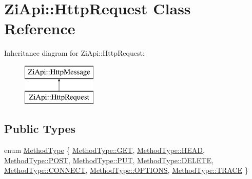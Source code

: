 \hypertarget{classZiApi_1_1HttpRequest}{}\section{Zi\+Api\+::Http\+Request Class Reference}
\label{classZiApi_1_1HttpRequest}
Inheritance diagram for Zi\+Api\+::Http\+Request\+:\begin{figure}[H]
\begin{center}
\leavevmode
\includegraphics[height=2.000000cm]{classZiApi_1_1HttpRequest}
\end{center}
\end{figure}
\subsection*{Public Types}
\begin{DoxyCompactItemize}
\item 
enum \mbox{\hyperlink{classZiApi_1_1HttpRequest_a8592cff867cbbc5cc43bd3a4d6053a1b}{Method\+Type}} \{ \newline
\mbox{\hyperlink{classZiApi_1_1HttpRequest_a8592cff867cbbc5cc43bd3a4d6053a1ba7528035a93ee69cedb1dbddb2f0bfcc8}{Method\+Type\+::\+G\+ET}}, 
\mbox{\hyperlink{classZiApi_1_1HttpRequest_a8592cff867cbbc5cc43bd3a4d6053a1bae15e216fc1c639f787b1231ecdfa1bf8}{Method\+Type\+::\+H\+E\+AD}}, 
\mbox{\hyperlink{classZiApi_1_1HttpRequest_a8592cff867cbbc5cc43bd3a4d6053a1baa02439ec229d8be0e74b0c1602392310}{Method\+Type\+::\+P\+O\+ST}}, 
\mbox{\hyperlink{classZiApi_1_1HttpRequest_a8592cff867cbbc5cc43bd3a4d6053a1ba3e75383a5992a6d15fb81e872e46e256}{Method\+Type\+::\+P\+UT}}, 
\newline
\mbox{\hyperlink{classZiApi_1_1HttpRequest_a8592cff867cbbc5cc43bd3a4d6053a1ba32f68a60cef40faedbc6af20298c1a1e}{Method\+Type\+::\+D\+E\+L\+E\+TE}}, 
\mbox{\hyperlink{classZiApi_1_1HttpRequest_a8592cff867cbbc5cc43bd3a4d6053a1bab57e2519e26151feacdbe52076bc39ec}{Method\+Type\+::\+C\+O\+N\+N\+E\+CT}}, 
\mbox{\hyperlink{classZiApi_1_1HttpRequest_a8592cff867cbbc5cc43bd3a4d6053a1ba164dd62adb30ca051b5289672a572f9b}{Method\+Type\+::\+O\+P\+T\+I\+O\+NS}}, 
\mbox{\hyperlink{classZiApi_1_1HttpRequest_a8592cff867cbbc5cc43bd3a4d6053a1ba2d3e4144aa384b18849ab9a8abad74d6}{Method\+Type\+::\+T\+R\+A\+CE}}
 \}
\end{DoxyCompactItemize}
